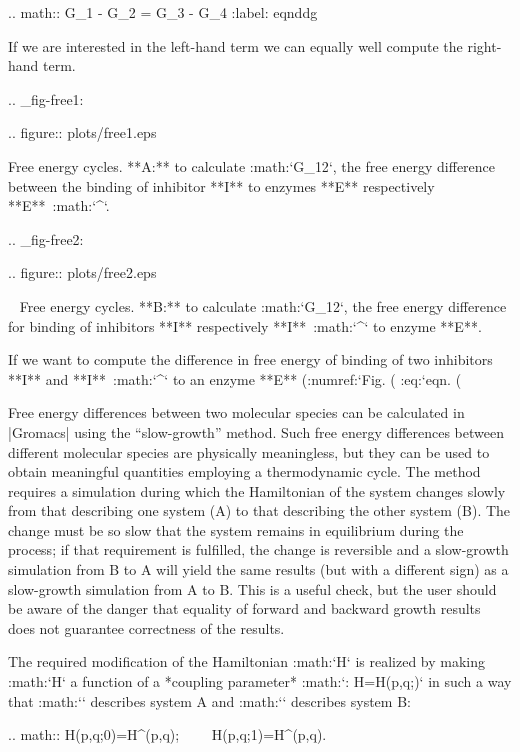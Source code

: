 .. math:: \Delta G_1 - \Delta G_2 =       \Delta G_3 - \Delta G_4
          :label: eqnddg

If we are interested in the left-hand term we can equally well compute
the right-hand term.

.. _fig-free1:

.. figure:: plots/free1.eps

            Free energy cycles. **A:** to calculate :math:`\Delta G_{12}`, the free
            energy difference between the binding of inhibitor **I** to enzymes
            **E** respectively **E**\ :math:`^{\prime}`. 

.. _fig-free2:

.. figure:: plots/free2.eps

            Free energy cycles. **B:** to calculate
            :math:`\Delta G_{12}`, the free energy difference for binding of
            inhibitors **I** respectively **I**\ :math:`^{\prime}` to enzyme
            **E**.

If we want to compute the difference in free energy of binding of two
inhibitors **I** and **I**\ :math:`^{\prime}` to an enzyme **E**
(:numref:`Fig. (%
:eq:`eqn. (%

Free energy differences between two molecular species can be calculated
in |Gromacs| using the “slow-growth” method. Such free energy differences
between different molecular species are physically meaningless, but they
can be used to obtain meaningful quantities employing a thermodynamic
cycle. The method requires a simulation during which the Hamiltonian of
the system changes slowly from that describing one system (A) to that
describing the other system (B). The change must be so slow that the
system remains in equilibrium during the process; if that requirement is
fulfilled, the change is reversible and a slow-growth simulation from B
to A will yield the same results (but with a different sign) as a
slow-growth simulation from A to B. This is a useful check, but the user
should be aware of the danger that equality of forward and backward
growth results does not guarantee correctness of the results.

The required modification of the Hamiltonian :math:`H` is realized by
making :math:`H` a function of a *coupling parameter* :math:`\lambda:
H=H(p,q;\lambda)` in such a way that :math:`` describes system
A and :math:`` describes system B:

.. math:: H(p,q;0)=H{^{}}(p,q);~~~~ H(p,q;1)=H{^{}}(p,q).

